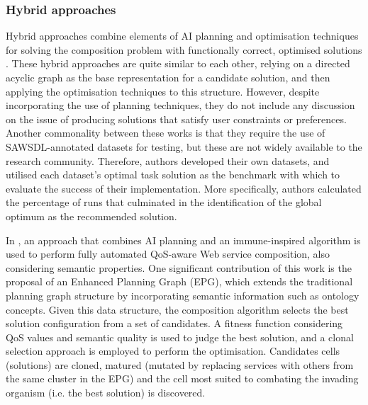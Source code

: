 \documentclass[conference]{IEEEtran}
\begin{document}
\subsubsection{Hybrid approaches}
Hybrid approaches combine elements of AI planning and optimisation techniques for solving the composition problem with functionally correct, optimised solutions \cite{pop2010immune,pop2011hybrid}. These hybrid approaches are quite similar to each other, relying on a directed acyclic graph as the base representation for a candidate solution, and then applying the optimisation techniques to this structure. However, despite incorporating the use of planning techniques, they do not include any discussion on the issue of producing solutions that satisfy user constraints or preferences. Another commonality between these works is that they require the use of SAWSDL-annotated datasets for testing, but these are not widely available to the research community. Therefore, authors developed their own datasets, and utilised each dataset's optimal task solution as the benchmark with which to evaluate the success of their implementation. More specifically, authors calculated the percentage of runs that culminated in the identification of the global optimum  as the recommended solution.

In \cite{pop2010immune}, an approach that combines AI planning and an immune-inspired algorithm is used to perform fully automated QoS-aware Web service composition, also considering
semantic properties. One significant contribution of this work is the proposal of an Enhanced Planning Graph (EPG), which extends the traditional planning graph structure
by incorporating semantic information such as ontology concepts. Given this data structure, the composition algorithm selects the best solution configuration from a set of candidates. A fitness function considering QoS values and semantic quality is used to judge the best solution, and a clonal selection approach is employed to perform the optimisation. Candidates cells (solutions) are cloned, matured (mutated by replacing services with others from the same cluster in the EPG) and the cell most suited to combating the invading organism (i.e. the best solution) is discovered.

\end{document}
